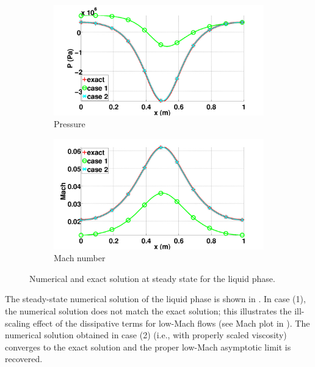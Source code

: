\begin{figure}[H]
        \begin{subfigure}[b]{0.495\textwidth}
                \centering
                \includegraphics[width=\textwidth]{figures/liquid_pressure_llf_and_exact_100.png}
                \caption{Pressure}
                \label{fig:liq-phase-press}
        \end{subfigure}        
        \begin{subfigure}[b]{0.495\textwidth}
                \centering
                \includegraphics[width=\textwidth]{figures/liquid_mach_llf_and_exact_100.png}
                \caption{Mach number}
                \label{fig:liq-phase-mach}
        \end{subfigure}
        \caption{Numerical and exact solution at steady state for the liquid phase.}\label{fig:liq-phase}
\end{figure}
%
The steady-state numerical solution of the liquid phase is shown in .
In case (1), the numerical solution does not match the exact solution; this illustrates the ill-scaling effect of the 
dissipative terms for low-Mach flows (see Mach plot in  ). The numerical solution obtained in case (2)
(i.e., with properly scaled viscosity) converges to the exact solution and the proper low-Mach asymptotic limit is recovered. 


